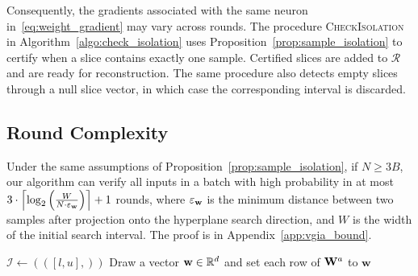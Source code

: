 Consequently, the gradients associated with the same neuron in~\eqref{eq:weight_gradient} may vary across rounds.
The procedure \textsc{CheckIsolation} in Algorithm~\ref{algo:check_isolation} uses Proposition~\ref{prop:sample_isolation} to certify when a slice contains exactly one sample. Certified slices are added to $\mathcal R$ and are ready for reconstruction. The same procedure also detects empty slices through a null slice vector, in which case the corresponding interval is discarded.

\subsection{Round Complexity}\label{sec:round_complexity_vgia}
 Under the same assumptions of Proposition~\ref{prop:sample_isolation},
if $N \geq 3B$, our algorithm can verify all inputs in a batch with high probability in at most
$
3 \cdot \left\lceil \log_2 \left(\frac{W}{N \cdot \varepsilon_{\mathbf w}}\right) \right\rceil + 1
$
rounds, where $\varepsilon_{\mathbf w}$ is the minimum distance between two samples after projection onto the hyperplane search direction, and $W$ is the width of the initial search interval. The proof is in Appendix~\ref{app:vgia_bound}.

\begin{algorithm2e}[H]
\caption{Verifiable Gradient Inversion Attack (VGIA)}
\label{algo:vgia_parallelattack}

$\mathcal I \leftarrow (([l, u],))$
Draw a vector $\mathbf{w}\in \mathbb{R}^d$ and set each row of $\mathbf{W}^a$ to $\mathbf{w}$\;
\end{algorithm2e}

